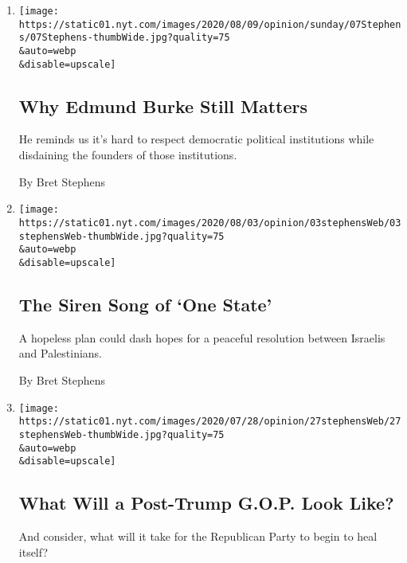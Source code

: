 \begin{enumerate}
\def\labelenumi{\arabic{enumi}.}
\item
  \href{/2020/08/05/opinion/sunday/edmund-burke.html}{}

  \texttt{[image: https://static01.nyt.com/images/2020/08/09/opinion/sunday/07Stephens/07Stephens-thumbWide.jpg?quality=75\\\&auto=webp\\\&disable=upscale]}

  \hypertarget{why-edmund-burke-still-matters}{%
  \subsection{Why Edmund Burke Still
  Matters}\label{why-edmund-burke-still-matters}}

  He reminds us it's hard to respect democratic political institutions
  while disdaining the founders of those institutions.

  By Bret Stephens
\item
  \href{/2020/08/03/opinion/israel-palestine-one-state-solution.html}{}

  \texttt{[image: https://static01.nyt.com/images/2020/08/03/opinion/03stephensWeb/03stephensWeb-thumbWide.jpg?quality=75\\\&auto=webp\\\&disable=upscale]}

  \hypertarget{the-siren-song-of-one-state}{%
  \subsection{The Siren Song of `One
  State'}\label{the-siren-song-of-one-state}}

  A hopeless plan could dash hopes for a peaceful resolution between
  Israelis and Palestinians.

  By Bret Stephens
\item
  \href{/2020/07/27/opinion/trump-2020.html}{}

  \texttt{[image: https://static01.nyt.com/images/2020/07/28/opinion/27stephensWeb/27stephensWeb-thumbWide.jpg?quality=75\\\&auto=webp\\\&disable=upscale]}

  \hypertarget{what-will-a-post-trump-gop-look-like}{%
  \subsection{What Will a Post-Trump G.O.P. Look
  Like?}\label{what-will-a-post-trump-gop-look-like}}

  And consider, what will it take for the Republican Party to begin to
  heal itself?


\end{enumerate}
